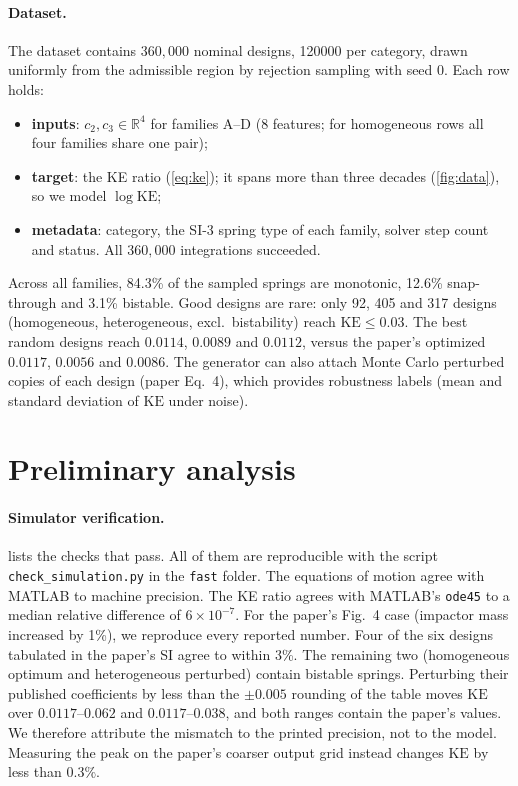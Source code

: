 \documentclass[12pt,letterpaper]{article}
\newcommand{\KE}{\mathrm{KE}}
\begin{document}
\paragraph{Dataset.}
The dataset contains $360{,}000$ nominal designs, \num{120000} per category, drawn
uniformly from the admissible region by rejection sampling with seed 0. Each row holds:
\begin{itemize}\itemsep0pt
  \item \textbf{inputs}: $c_2,c_3\in\mathbb{R}^4$ for families A--D (8 features; for
        homogeneous rows all four families share one pair);
  \item \textbf{target}: the KE ratio (\cref{eq:ke}); it spans more than three decades
        (\cref{fig:data}), so we model $\log\KE$;
  \item \textbf{metadata}: category, the SI-3 spring type of each family, solver step
        count and status. All $360{,}000$ integrations succeeded.
\end{itemize}
Across all families, 84.3\% of the sampled springs are monotonic, 12.6\% snap-through
and 3.1\% bistable. Good designs are rare: only 92, 405 and 317 designs (homogeneous,
heterogeneous, excl.\ bistability) reach $\KE\le0.03$. The best random designs reach
$0.0114$, $0.0089$ and $0.0112$, versus the paper's optimized $0.0117$, $0.0056$ and
$0.0086$. The generator can also attach Monte Carlo perturbed copies of each design
(paper Eq.~4), which provides robustness labels (mean and standard deviation of $\KE$
under noise).

\section{Preliminary analysis}

\paragraph{Simulator verification.}
 lists the checks that pass. All of them are
reproducible with the script \texttt{check\_simulation.py} in the \texttt{fast} folder. The equations of motion agree with MATLAB to
machine precision. The KE ratio agrees with MATLAB's \texttt{ode45} to a median relative
difference of $6\times10^{-7}$. For the paper's Fig.~4 case (impactor mass increased by
1\%), we reproduce every reported number. Four of the six designs tabulated in the
paper's SI agree to within 3\%. The remaining two (homogeneous optimum and heterogeneous
perturbed) contain bistable springs. Perturbing their published coefficients by less
than the $\pm0.005$ rounding of the table moves $\KE$ over $0.0117$--$0.062$ and
$0.0117$--$0.038$, and both ranges contain the paper's values. We therefore attribute
the mismatch to the printed precision, not to the model. Measuring the peak on the
paper's coarser output grid instead changes $\KE$ by less than $0.3\%$.
\end{document}
